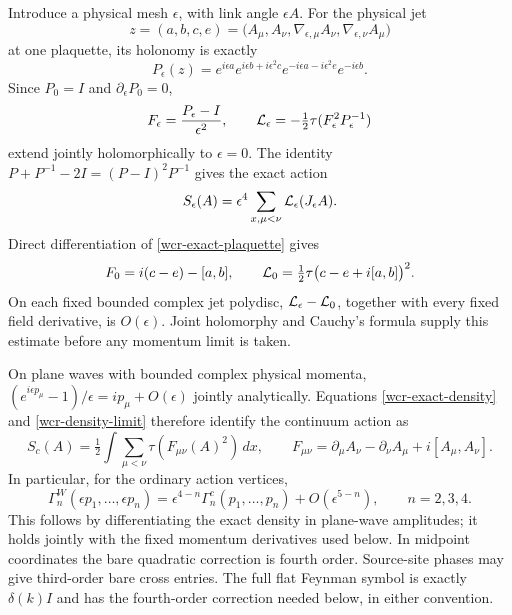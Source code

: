 Introduce a physical mesh \(\epsilon\), with link angle \(\epsilon A\).
For the physical jet
\[
 z=(a,b,c,e)
 =\bigl(A_\mu,A_\nu,\nabla_{\epsilon,\mu}A_\nu,
                         \nabla_{\epsilon,\nu}A_\mu\bigr)
\]
at one plaquette, its holonomy is exactly
\begin{equation}
 P_\epsilon(z)=e^{i\epsilon a}e^{i\epsilon b+i\epsilon^2c}
              e^{-i\epsilon a-i\epsilon^2e}e^{-i\epsilon b}.
 \label{wcr-exact-plaquette}
\end{equation}
Since \(P_0=I\) and \(\partial_\epsilon P_0=0\),
\[
 F_\epsilon=\frac{P_\epsilon-I}{\epsilon^2},\qquad
 {\cal L}_\epsilon=-\tfrac12\tau(F_\epsilon^2P_\epsilon^{-1})
\]
extend jointly holomorphically to \(\epsilon=0\).
The identity \(P+P^{-1}-2I=(P-I)^2P^{-1}\) gives the exact action
\begin{equation}
 S_\epsilon(A)=\epsilon^4\sum_{x,\mu<\nu}
                 {\cal L}_\epsilon(J_\epsilon A).
 \label{wcr-exact-density}
\end{equation}
Direct differentiation of \eqref{wcr-exact-plaquette} gives
\begin{equation}
 F_0=i(c-e)-[a,b],\qquad
 {\cal L}_0=\tfrac12\tau\bigl(c-e+i[a,b]\bigr)^2.
 \label{wcr-density-limit}
\end{equation}
On each fixed bounded complex jet polydisc,
\({\cal L}_\epsilon-{\cal L}_0\), together with every fixed field
derivative, is \(O(\epsilon)\). Joint holomorphy and Cauchy's formula
supply this estimate before any momentum limit is taken.

On plane waves with bounded complex physical momenta,
\((e^{i\epsilon p_\mu}-1)/\epsilon=ip_\mu+O(\epsilon)\)
jointly analytically. Equations \eqref{wcr-exact-density} and
\eqref{wcr-density-limit} therefore identify the continuum action as
\begin{equation}
 S_c(A)=\tfrac12\int\sum_{\mu<\nu}\tau(F_{\mu\nu}(A)^2)\,dx,\qquad
 F_{\mu\nu}=\partial_\mu A_\nu-\partial_\nu A_\mu+i[A_\mu,A_\nu].
 \label{wcr-continuum-action}
\end{equation}
In particular, for the ordinary action vertices,
\begin{equation}
 \Gamma_n^W(\epsilon p_1,\ldots,\epsilon p_n)
 =\epsilon^{4-n}\Gamma_n^c(p_1,\ldots,p_n)
                  +O(\epsilon^{5-n}),\qquad n=2,3,4.
 \label{wcr-engineering}
\end{equation}
This follows by differentiating the exact density in plane-wave
amplitudes; it holds jointly with the fixed momentum derivatives used
below. In midpoint coordinates the bare quadratic correction is fourth
order. Source-site phases may give third-order bare cross entries.
The full flat Feynman symbol is exactly \(\delta(k)I\) and has the
fourth-order correction needed below, in either convention.

